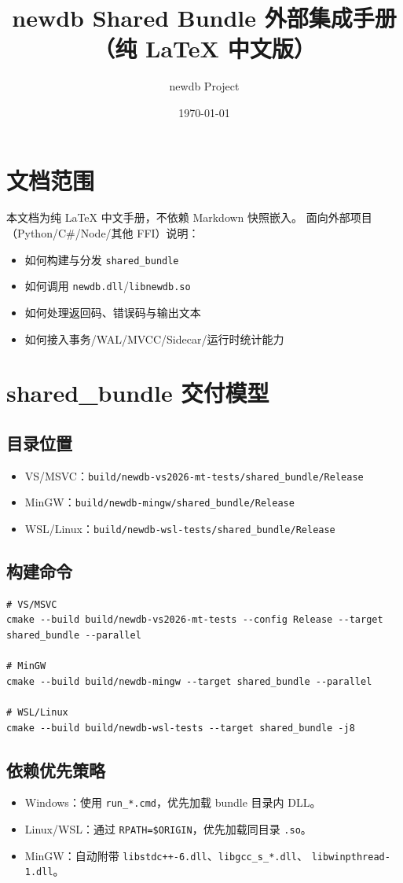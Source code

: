 \documentclass[11pt,a4paper]{ctexart}
\title{newdb Shared Bundle 外部集成手册（纯 LaTeX 中文版）}
\author{newdb Project}
\date{\today}
\begin{document}
\maketitle
\tableofcontents
\newpage

\section{文档范围}
本文档为纯 LaTeX 中文手册，不依赖 Markdown 快照嵌入。
面向外部项目（Python/C\#/Node/其他 FFI）说明：
\begin{itemize}
  \item 如何构建与分发 \texttt{shared\_bundle}
  \item 如何调用 \texttt{newdb.dll}/\texttt{libnewdb.so}
  \item 如何处理返回码、错误码与输出文本
  \item 如何接入事务/WAL/MVCC/Sidecar/运行时统计能力
\end{itemize}

\section{shared\_bundle 交付模型}
\subsection{目录位置}
\begin{itemize}
  \item VS/MSVC：\texttt{build/newdb-vs2026-mt-tests/shared\_bundle/Release}
  \item MinGW：\texttt{build/newdb-mingw/shared\_bundle/Release}
  \item WSL/Linux：\texttt{build/newdb-wsl-tests/shared\_bundle/Release}
\end{itemize}

\subsection{构建命令}
\begin{lstlisting}
# VS/MSVC
cmake --build build/newdb-vs2026-mt-tests --config Release --target shared_bundle --parallel

# MinGW
cmake --build build/newdb-mingw --target shared_bundle --parallel

# WSL/Linux
cmake --build build/newdb-wsl-tests --target shared_bundle -j8
\end{lstlisting}

\subsection{依赖优先策略}
\begin{itemize}
  \item Windows：使用 \texttt{run\_*.cmd}，优先加载 bundle 目录内 DLL。
  \item Linux/WSL：通过 \texttt{RPATH=\$ORIGIN}，优先加载同目录 \texttt{.so}。
  \item MinGW：自动附带 \texttt{libstdc++-6.dll}、\texttt{libgcc\_s\_*.dll}、
  \texttt{libwinpthread-1.dll}。
\end{itemize}
\end{document}

